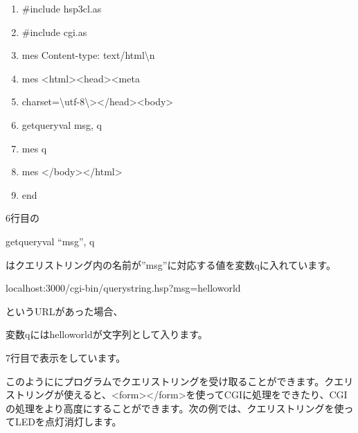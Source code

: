 \documentclass[a4paper,12pt,dvipdfmx]{jarticle}
\begin{document}
\centering
\begin{boxedminipage}{16.233cm}
	\begin{enumerate}
	\baselineskip 10pt
	\setlength{\itemsep}{0cm}
	\item\#include {\textquotedbl}hsp3cl.as{\textquotedbl}

	\item\#include {\textquotedbl}cgi.as{\textquotedbl}

	\item mes {\textquotedbl}Content-type: text/html{\textbackslash}n{\textquotedbl}

	\item mes {\textquotedbl}{\textless}html{\textgreater}{\textless}head{\textgreater}{\textless}meta
	\item charset={\textbackslash}{\textquotedbl}utf-8{\textbackslash}{\textquotedbl}{\textgreater}{\textless}/head{\textgreater}{\textless}body{\textgreater}{\textquotedbl}

	\item getqueryval {\textquotedbl}msg{\textquotedbl}, q

	\item mes q

	\item mes {\textquotedbl}{\textless}/body{\textgreater}{\textless}/html{\textgreater}{\textquotedbl}

	\item end
	\end{enumerate}
\end{boxedminipage}
\flushleft


\bigskip


\bigskip

6行目の

getqueryval “msg”, q

はクエリストリング内の名前が”msg”に対応する値を変数qに入れています。

localhost:3000/cgi-bin/querystring.hsp?msg=helloworld

というURLがあった場合、

変数qにはhelloworldが文字列として入ります。

7行目で表示をしています。

このようににプログラムでクエリストリングを受け取ることができます。クエリストリングが使えると、{\textless}form{\textgreater}{\textless}/form{\textgreater}を使ってCGIに処理をできたり、CGIの処理をより高度にすることができます。次の例では、クエリストリングを使ってLEDを点灯消灯します。
\end{document}
